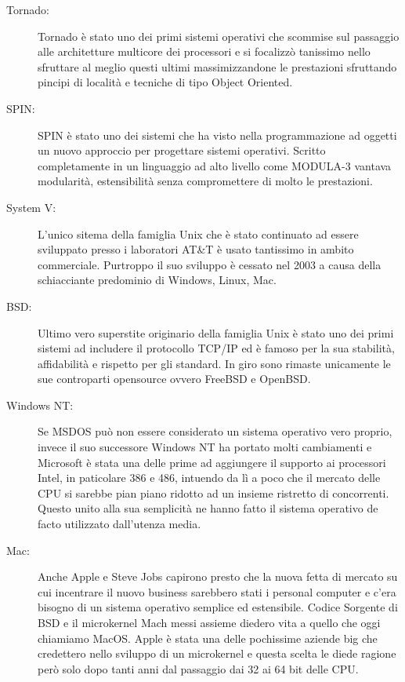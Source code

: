 \begin{description}
  \item[Tornado:] Tornado è stato uno dei primi sistemi operativi che scommise sul passaggio alle architetture multicore dei processori e si focalizzò tanissimo nello sfruttare al meglio questi ultimi massimizzandone le prestazioni sfruttando pincipi di località e tecniche di tipo Object Oriented.\cite{gamsa98}
  \item[SPIN:] SPIN è stato uno dei sistemi che ha visto nella programmazione ad oggetti un nuovo approccio per progettare sistemi operativi. Scritto completamente in un linguaggio ad alto livello come MODULA-3 vantava modularità, estensibilità senza compromettere di molto le prestazioni.\cite{bershad94}
  \item[System V:] L'unico sitema della famiglia Unix che è stato continuato ad essere sviluppato presso i laboratori AT\&T è usato tantissimo in ambito commerciale. Purtroppo il suo sviluppo è cessato nel 2003 a causa della schiacciante predominio di Windows, Linux, Mac.
  \item[BSD:] Ultimo vero superstite originario della famiglia Unix è stato uno dei primi sistemi ad includere il protocollo TCP/IP ed è famoso per la sua stabilità, affidabilità e rispetto per gli standard. In giro sono rimaste unicamente le sue controparti opensource ovvero FreeBSD e OpenBSD.
  \item[Windows NT:] Se MSDOS può non essere considerato un sistema operativo vero proprio, invece il suo successore Windows NT ha portato molti cambiamenti e Microsoft è stata una delle prime ad aggiungere il supporto ai processori Intel, in paticolare 386 e 486, intuendo da lì a poco che il mercato delle CPU si sarebbe pian piano ridotto ad un insieme ristretto di concorrenti. Questo unito alla sua semplicità ne hanno fatto il sistema operativo de facto utilizzato dall'utenza media.
  \item[Mac:] Anche Apple e Steve Jobs capirono presto che la nuova fetta di mercato su cui incentrare il nuovo business sarebbero stati i personal computer e c'era bisogno di un sistema operativo semplice ed estensibile. Codice Sorgente di BSD e il microkernel Mach messi assieme diedero vita a quello che oggi chiamiamo MacOS. Apple è stata una delle pochissime aziende big che credettero nello sviluppo di un microkernel e questa scelta le diede ragione però solo dopo tanti anni dal passaggio dai 32 ai 64 bit delle CPU.

\end{description}
